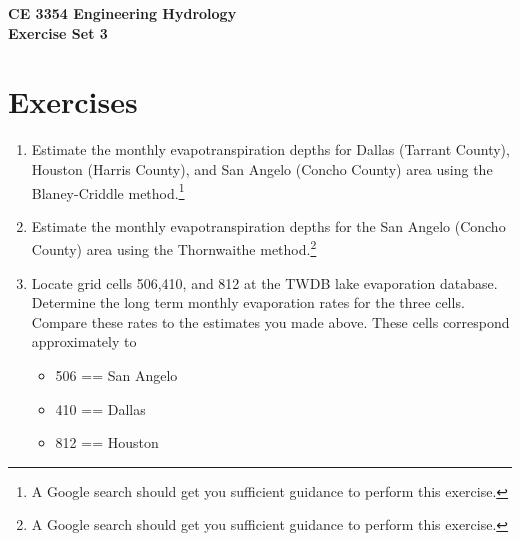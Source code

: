 \documentclass[12pt]{article}
\begin{document}
\begin{center}
{\textbf{{ CE 3354 Engineering Hydrology} \\ {Exercise Set 3}}}
\end{center}

 \section*{\small{Exercises}}
 \begin{enumerate}

\item Estimate the monthly evapotranspiration depths for Dallas (Tarrant County), Houston (Harris County), and San Angelo (Concho County) area using the Blaney-Criddle method.\footnote{A Google search should get you sufficient guidance to perform this exercise.}

\item Estimate the monthly evapotranspiration depths for the San Angelo (Concho County) area using the Thornwaithe method.\footnote{A Google search should get you sufficient guidance to perform this exercise.}

\item Locate grid cells 506,410, and 812 at the TWDB lake evaporation database. Determine the long term monthly evaporation rates for the three cells.  Compare these rates to the estimates you made above.  These cells correspond approximately to
\begin{itemize}
\item 506 == San Angelo
\item 410 == Dallas
\item 812 == Houston
\end{itemize}

\end{enumerate}
\end{document}
